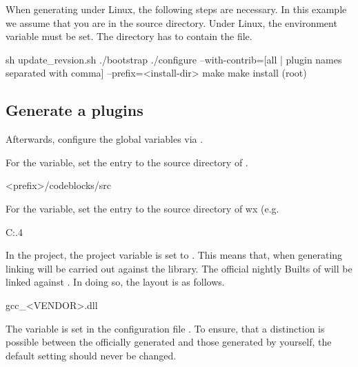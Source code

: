 When generating under Linux, the following steps are necessary. In this example we assume that you are in the \codeblocks source directory.  Under Linux, the environment variable  must be set. The  directory has to contain the  file.



\begin{cmd}
sh update_revsion.sh
./bootstrap
./configure --with-contrib=[all | plugin names separated with comma] --prefix=<install-dir>
make
make install (root)
\end{cmd}

\subsection{Generate a plugins}

Afterwards, configure the global variables via .


For the  variable, set the  entry to the source directory of \codeblocks.

\begin{cmd}
<prefix>/codeblocks/src
\end{cmd}


For the  variable, set the  entry to the source directory of wx (e.g.

\begin{cmd}
C:\Programme{}.4
\end{cmd}

In the \codeblocks project, the project variable  is set to . This means that, when generating \codeblocks linking will be carried out against the  library. The official nightly Builts of \codeblocks will be linked against . In doing so, the layout is as follows.

\begin{code}
gcc_<VENDOR>.dll
\end{code}

The  variable is set in the configuration file . To ensure, that a distinction is possible between the officially generated \codeblocks and those generated by yourself, the default setting  should never be changed.

